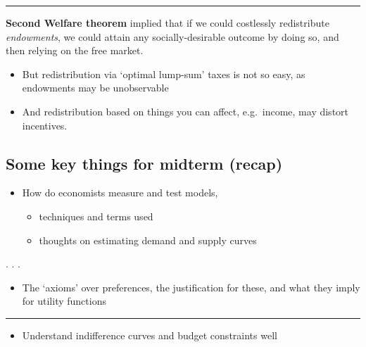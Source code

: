 \documentclass[]{article}
\providecommand{\tightlist}{%
  \setlength{\itemsep}{0pt}\setlength{\parskip}{0pt}}
\begin{document}
\begin{center}\rule{0.5\linewidth}{\linethickness}\end{center}

\textbf{Second Welfare theorem} implied that if we could costlessly redistribute \emph{endowments}, we could attain any socially-desirable outcome by doing so, and then relying on the free market.

\begin{itemize}
\item
  But redistribution via `optimal lump-sum' taxes is not so easy, as endowments may be unobservable
\item
  And redistribution based on things you can affect, e.g.~income, may distort incentives.
\end{itemize}

\hypertarget{some-key-things-for-midterm-recap}{%
\subsection{Some key things for midterm (recap)}\label{some-key-things-for-midterm-recap}}

\begin{itemize}
\tightlist
\item
  How do economists measure and test models,

  \begin{itemize}
  \tightlist
  \item
    techniques and terms used
  \item
    thoughts on estimating demand and supply curves
  \end{itemize}
\end{itemize}

. . .

\bigskip

\bigskip

\begin{itemize}
\tightlist
\item
  The `axioms' over preferences, the justification for these, and what they imply for utility functions
\end{itemize}

\begin{center}\rule{0.5\linewidth}{\linethickness}\end{center}

\begin{itemize}
\tightlist
\item
  Understand indifference curves and budget constraints well
\end{itemize}
\end{document}
